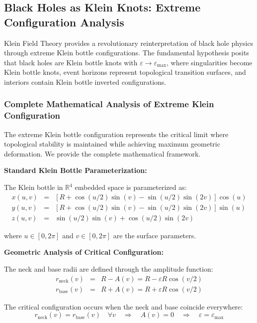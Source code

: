 \documentclass[12pt]{iopart}
\begin{document}
\subsection{Black Holes as Klein Knots: Extreme Configuration Analysis}

Klein Field Theory provides a revolutionary reinterpretation of black hole physics through extreme Klein bottle configurations. The fundamental hypothesis posits that black holes are Klein bottle knots with $\varepsilon \to \varepsilon_{\max}$, where singularities become Klein bottle knots, event horizons represent topological transition surfaces, and interiors contain Klein bottle inverted configurations.

\subsubsection{Complete Mathematical Analysis of Extreme Klein Configuration}

The extreme Klein bottle configuration represents the critical limit where topological stability is maintained while achieving maximum geometric deformation. We provide the complete mathematical framework.

\textbf{Standard Klein Bottle Parameterization:}

The Klein bottle in $\mathbb{R}^4$ embedded space is parameterized as:
\begin{eqnarray}
x(u,v) &=& [R + \cos(u/2)\sin(v) - \sin(u/2)\sin(2v)] \cos(u) \label{eq:klein_x}\\
y(u,v) &=& [R + \cos(u/2)\sin(v) - \sin(u/2)\sin(2v)] \sin(u) \label{eq:klein_y}\\
z(u,v) &=& \sin(u/2)\sin(v) + \cos(u/2)\sin(2v) \label{eq:klein_z}
\end{eqnarray}

where $u \in [0, 2\pi]$ and $v \in [0, 2\pi]$ are the surface parameters.

\textbf{Geometric Analysis of Critical Configuration:}

The neck and base radii are defined through the amplitude function:
\begin{eqnarray}
r_{\text{neck}}(v) &=& R - A(v) = R - \varepsilon R \cos(v/2) \label{eq:neck_radius}\\
r_{\text{base}}(v) &=& R + A(v) = R + \varepsilon R \cos(v/2) \label{eq:base_radius}
\end{eqnarray}

The critical configuration occurs when the neck and base coincide everywhere:
\begin{equation}
r_{\text{neck}}(v) = r_{\text{base}}(v) \quad \forall v \quad \Rightarrow \quad A(v) = 0 \quad \Rightarrow \quad \varepsilon = \varepsilon_{\max}
\label{eq:critical_condition}
\end{equation}
\end{document}
